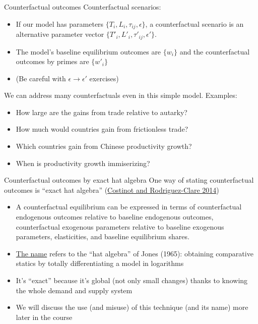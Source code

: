\documentclass[10pt,notes=hide]{beamer}
\begin{document}
\begin{frame}{Counterfactual outcomes}
Counterfactual scenarios:
\begin{itemize}
\item If our model has parameters $\{T_i,L_i,\tau_{ij},\epsilon\}$,
a counterfactual scenario is an alternative parameter vector
$\{T'_i,L'_i,\tau'_{ij},\epsilon'\}$.
\item The model's baseline equilibrium outcomes are $\{w_{i}\}$
and the counterfactual outcomes by primes are $\{w'_{i}\}$
\item[] (Be careful with $\epsilon \to \epsilon'$ exercises)
\end{itemize}
We can address many counterfactuals even in this simple model. Examples:
\begin{itemize}
\item How large are the gains from trade relative to autarky?
\item How much would countries gain from frictionless trade?
\item Which countries gain from Chinese productivity growth?
\item When is productivity growth immiserizing?
\end{itemize}
\end{frame}
\begin{frame}{Counterfactual outcomes by exact hat algebra}
One way of stating counterfactual outcomes is ``exact hat algebra''
(\href{https://doi.org/10.1016/B978-0-444-54314-1.00004-5}{Costinot and Rodriguez-Clare 2014})
\begin{itemize}
\item A counterfactual equilibrium can be expressed in terms of
counterfactual endogenous outcomes relative to baseline endogenous outcomes,
counterfactual exogenous parameters relative to baseline exogenous parameters,
elasticities,
and
baseline equilibrium shares.
\item \href{https://tradediversion.net/2018/05/07/on-hat-algebra/}{The name} refers to the ``hat algebra'' of Jones (1965):
obtaining comparative statics by totally differentiating a model in logarithms
\item It's ``exact'' because it's global (not only small changes) thanks to knowing the whole demand and supply system
\item We will discuss the use (and misuse) of this technique (and its name) more later in the course
\end{itemize}
\end{frame}
\end{document}
